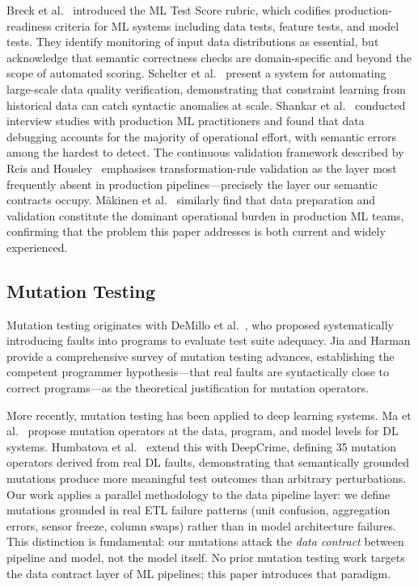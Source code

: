 \documentclass[journal]{IEEEtran}
\begin{document}
Breck et al.\ \cite{breck2017} introduced the ML Test Score rubric, which
codifies production-readiness criteria for ML systems including data tests,
feature tests, and model tests.  They identify monitoring of input data
distributions as essential, but acknowledge that semantic correctness checks
are domain-specific and beyond the scope of automated scoring.  Schelter
et al.\ \cite{schelter2018automating} present a system for automating
large-scale data quality verification, demonstrating that constraint
learning from historical data can catch syntactic anomalies at scale.
Shankar et al.\ \cite{shankar2022operationalizing} conducted interview
studies with production ML practitioners and found that data debugging
accounts for the majority of operational effort, with semantic errors
among the hardest to detect.  The continuous validation framework described by Reis and 
Housley~\cite{reis2022} emphasises transformation-rule validation 
as the layer most frequently absent in production pipelines---precisely 
the layer our semantic contracts occupy. M\"{a}kinen et 
al.~\cite{makinen2021mlops} similarly find that data preparation and 
validation constitute the dominant operational burden in production ML 
teams, confirming that the problem this paper addresses is both current 
and widely experienced.

\subsection{Mutation Testing}

Mutation testing originates with DeMillo et al.\ \cite{demillo1978}, who
proposed systematically introducing faults into programs to evaluate test
suite adequacy.  Jia and Harman \cite{jia2010} provide a comprehensive
survey of mutation testing advances, establishing the competent programmer
hypothesis---that real faults are syntactically close to correct
programs---as the theoretical justification for mutation operators.

More recently, mutation testing has been applied to deep learning systems.
Ma et al.\ \cite{ma2018deepmutation} propose mutation operators at the data,
program, and model levels for DL systems.  Humbatova et al.\
\cite{humbatova2021deepcrime} extend this with DeepCrime, defining 35
mutation operators derived from real DL faults, demonstrating that
semantically grounded mutations produce more meaningful test outcomes than
arbitrary perturbations.  Our work applies a parallel methodology to the
data pipeline layer: we define mutations grounded in real ETL failure
patterns (unit confusion, aggregation errors, sensor freeze, column swaps)
rather than in model architecture failures.  This distinction is
fundamental: our mutations attack the \emph{data contract} between pipeline
and model, not the model itself.  No prior mutation testing work targets the
data contract layer of ML pipelines; this paper introduces that paradigm.
\end{document}
